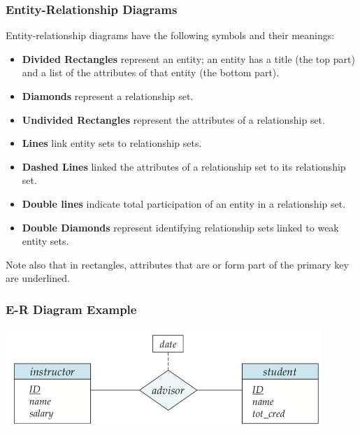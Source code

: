 \begin{frame}
\frametitle{Entity-Relationship Diagrams}

Entity-relationship diagrams have the following symbols and their meanings:

\begin{itemize}
	\item \textbf{Divided Rectangles} represent an entity; an entity has a title (the top part) and a list of the attributes of that entity (the bottom part).
	\item \textbf{Diamonds} represent a relationship set.
	\item \textbf{Undivided Rectangles} represent the attributes of a relationship set. 
	\item \textbf{Lines} link entity sets to relationship sets.
	\item \textbf{Dashed Lines} linked the attributes of a relationship set to its relationship set.
	\item \textbf{Double lines} indicate total participation of an entity in a relationship set.
	\item \textbf{Double Diamonds} represent identifying relationship sets linked to weak entity sets.
\end{itemize}

Note also that in rectangles, attributes that are or form part of the primary key are underlined. 

\end{frame}



\begin{frame}
\frametitle{E-R Diagram Example}

\begin{center}
\includegraphics[width=0.9\textwidth]{images/er-with-attr}\\
\end{center}


\end{frame}



